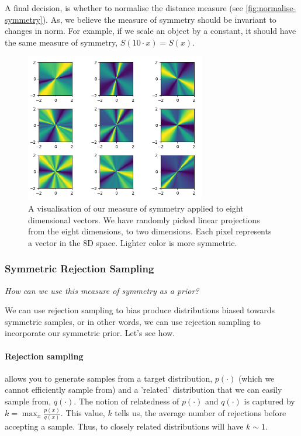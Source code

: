 A final decision, is whether to normalise the distance measure (see \ref{fig:normalise-symmetry}).
As, we believe the measure of symmetry should be invariant to changes in norm.
For example, if we scale an object by a constant, it should have the same measure of symmetry, $S(10 \cdot x) = S(x)$.

\begin{figure}[h!]
\centering
\includegraphics[width=0.7\textwidth,height=0.35\textheight]{../../pictures/figures/complexity_surface_nd-8d.png}
\caption{A visualisation of our measure of symmetry applied to eight dimensional vectors.
We have randomly picked linear projections from the eight dimensions, to two dimensions.
Each pixel represents a vector in the 8D space. Lighter color is more symmetric.}
\label{fig:symmetry-topology}
\end{figure}

\newpage
\mbox{}
\newpage
\subsubsection{Symmetric Rejection Sampling}\label{rejection-sampling}

\begin{displayquote}
	\textit{How can we use this measure of symmetry as a prior?}
\end{displayquote}

We can use rejection sampling to bias produce distributions biased towards symmetric
samples, or in other words, we can use rejection sampling to incorporate our symmetric prior. Let's see how.

\paragraph{Rejection sampling} allows you to generate samples from a target distribution, $p(\cdot)$ (which we cannot efficiently sample from) and a 'related' distribution that we can easily sample from, $q(\cdot)$.
The notion of relatedness of $p(\cdot)$ and $q(\cdot)$ is captured by $k = \mathop{\text{max}}_x \frac{p(x)}{q(x)}$.
This value, $k$ tells us, the average number of rejections before accepting a sample.
Thus, to closely related distributions will have $k\sim 1$. \cite{W.R.1992, Owen2013}

